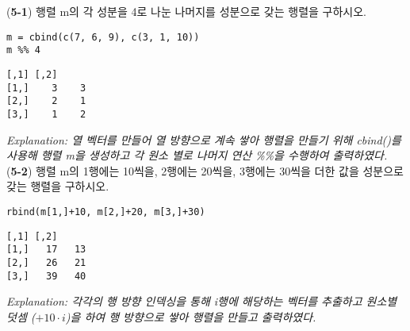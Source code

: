 \documentclass{article}
\begin{document}
(\textbf{5-1}) 행렬 m의 각 성분을 4로 나눈 나머지를 성분으로 갖는 행렬을 구하시오.
\begin{lstlisting}[style={r-style}]
m = cbind(c(7, 6, 9), c(3, 1, 10))
m %% 4
\end{lstlisting}
\begin{lstlisting}[style={out-style}]
     [,1] [,2]
[1,]    3    3
[2,]    2    1
[3,]    1    2
\end{lstlisting}
\emph{Explanation: 열 벡터를 만들어 열 방향으로 계속 쌓아 행렬을 만들기 위해 cbind()를 사용해 행렬 m을 생성하고 각 원소 별로 나머지 연산 \%\%을 수행하여 출력하였다.} \\

(\textbf{5-2}) 행렬 m의 1행에는 10씩을, 2행에는 20씩을, 3행에는 30씩을 더한 값을 성분으로 갖는 행렬을 구하시오.
\begin{lstlisting}[style={r-style}]
rbind(m[1,]+10, m[2,]+20, m[3,]+30)
\end{lstlisting}
\begin{lstlisting}[style={out-style}]
     [,1] [,2]
[1,]   17   13
[2,]   26   21
[3,]   39   40
\end{lstlisting}
\emph{Explanation: 각각의 행 방향 인덱싱을 통해 i행에 해당하는 벡터를 추출하고 원소별 덧셈 ($ + 10\cdot i$)을 하여 행 방향으로 쌓아 행렬을 만들고 출력하였다.} \\
\end{document}

